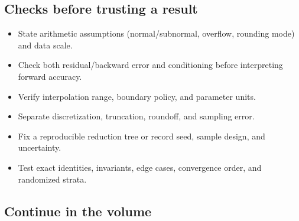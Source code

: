\subsection{Checks before trusting a result}\label{checks-before-trusting-a-result}

\begin{itemize}
\tightlist
\item
  State arithmetic assumptions (normal/subnormal, overflow, rounding mode) and data scale.
\item
  Check both residual/backward error and conditioning before interpreting forward accuracy.
\item
  Verify interpolation range, boundary policy, and parameter units.
\item
  Separate discretization, truncation, roundoff, and sampling error.
\item
  Fix a reproducible reduction tree or record seed, sample design, and uncertainty.
\item
  Test exact identities, invariants, edge cases, convergence order, and randomized strata.
\end{itemize}

\subsection{Continue in the volume}\label{continue-in-the-volume}

